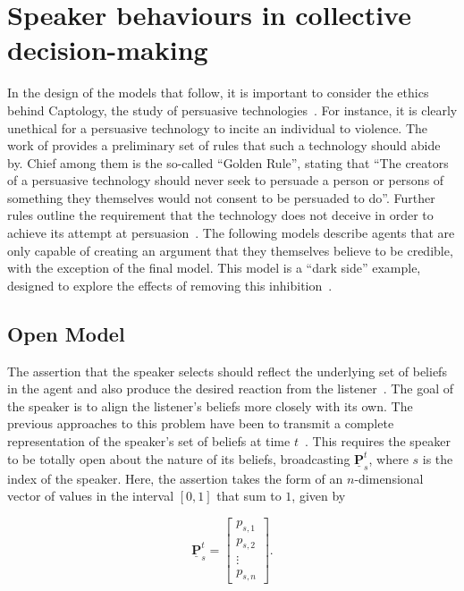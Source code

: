 \section{Speaker behaviours in collective decision-making} \label{sect:speaker_models}

\fancyfoot[RE,LO]{\rightmark}

In the design of the models that follow, it is important to consider the ethics behind Captology, the study of persuasive technologies~\cite{Atkinson2006Captology:Review}. For instance, it is clearly unethical for a persuasive technology to incite an individual to violence. The work of \cite{Berdichievsky1999TowardsTechnology} provides a preliminary set of rules that such a technology should abide by. Chief among them is the so-called ``Golden Rule'', stating that ``The creators of a persuasive technology should never seek to persuade a person or persons of something they themselves would not consent to be persuaded to do''. Further rules outline the requirement that the technology does not deceive in order to achieve its attempt at persuasion~\cite{Calvo2014TheComputing}. The following models describe agents that are only capable of creating an argument that they themselves believe to be credible, with the exception of the final model. This model is a ``dark side'' example, designed to explore the effects of removing this inhibition~\cite{Berdichievsky1999TowardsTechnology}.

\subsection*{Open Model}

The assertion that the speaker selects should reflect the underlying set of beliefs in the agent and also produce the desired reaction from the listener~\cite{Lewis2002Convention:Study}. The goal of the speaker is to align the listener's beliefs more closely with its own. The previous approaches to this problem have been to transmit a complete representation of the speaker's set of beliefs at time $t$~\cite{Degroot1974ReachingConsensus, Lee2018CombiningConsensus, Friedkin1999SocialChange, Hegselmann2002OpinionSimulation}. This requires the speaker to be totally open about the nature of its beliefs, broadcasting  $\underline{\mathbf{P}}_{s}^t$, where $s$ is the index of the speaker. Here, the assertion takes the form of an $n$-dimensional vector of values in the interval $[0,1]$ that sum to $1$, given by

\begin{center}
\begin{equation}
\underline{\mathbf{P}}^t_s = \begin{bmatrix} p_{s, 1}\\ p_{s, 2}\\ \vdots \\ p_{s, n} \end{bmatrix}.
\end{equation}
\end{center}


